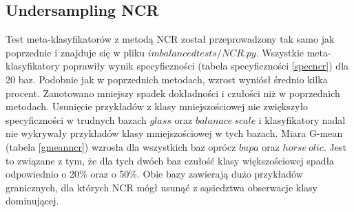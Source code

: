\subsection{Undersampling NCR}
Test meta-klasyfikatorów z metodą NCR został przeprowadzony tak samo jak poprzednie i znajduje się w pliku $imbalancedtests/NCR.py$. Wszystkie meta-klasyfikatory poprawiły wynik specyficzności (tabela specyficzności \ref{specncr}) dla 20 baz. Podobnie jak w poprzednich metodach, wzrost wyniósł średnio kilka procent. Zanotowano mniejszy spadek dokładności i czułości niż w poprzednich metodach. Usunięcie przykładów z klasy mniejszościowej nie zwiększyło specyficzności w trudnych bazach $glass$ oraz $balanace\: scale$ i klasyfikatory nadal nie wykrywały przykładów klasy mniejszościowej w tych bazach. Miara G-mean (tabela \ref{gmeanncr}) wzrosła dla wszystkich baz oprócz $bupa$ oraz $horse\: olic$. Jest to związane z tym, że dla tych dwóch baz czułość klasy większościowej spadła odpowiednio o 20\% oraz o 50\%. Obie bazy zawierają dużo przykładów granicznych, dla których NCR mógł usunąć z sąsiedztwa obserwacje klasy dominującej.
